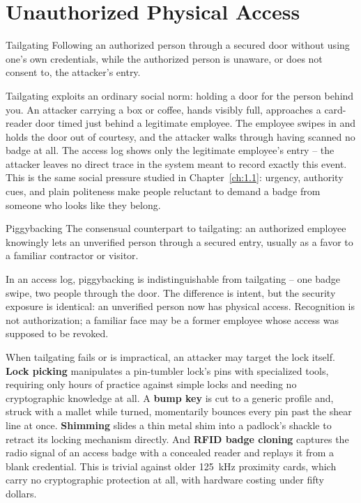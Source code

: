 \section{Unauthorized Physical Access}

\begin{definition}{Tailgating}
Following an authorized person through a secured door without using one's own credentials, while
the authorized person is unaware, or does not consent to, the attacker's entry.
\end{definition}

Tailgating exploits an ordinary social norm: holding a door for the person behind you. An attacker
carrying a box or coffee, hands visibly full, approaches a card-reader door timed just behind a
legitimate employee. The employee swipes in and holds the door out of courtesy, and the attacker
walks through having scanned no badge at all. The access log shows only the legitimate employee's
entry -- the attacker leaves no direct trace in the system meant to record exactly this event.
This is the same social pressure studied in Chapter~\ref{ch:1.1}: urgency, authority cues, and
plain politeness make people reluctant to demand a badge from someone who looks like they belong.

\begin{definition}{Piggybacking}
The consensual counterpart to tailgating: an authorized employee knowingly lets an unverified
person through a secured entry, usually as a favor to a familiar contractor or visitor.
\end{definition}

In an access log, piggybacking is indistinguishable from tailgating -- one badge swipe, two
people through the door. The difference is intent, but the security exposure is identical: an
unverified person now has physical access. Recognition is not authorization; a familiar face may
be a former employee whose access was supposed to be revoked.

When tailgating fails or is impractical, an attacker may target the lock itself. \textbf{Lock
picking} manipulates a pin-tumbler lock's pins with specialized tools, requiring only hours of
practice against simple locks and needing no cryptographic knowledge at all. A \textbf{bump key}
is cut to a generic profile and, struck with a mallet while turned, momentarily bounces every pin
past the shear line at once. \textbf{Shimming} slides a thin metal shim into a padlock's shackle to
retract its locking mechanism directly. And \textbf{RFID badge cloning} captures the radio signal
of an access badge with a concealed reader and replays it from a blank credential. This is trivial
against older 125~kHz proximity cards, which carry no cryptographic protection at all, with
hardware costing under fifty dollars.

